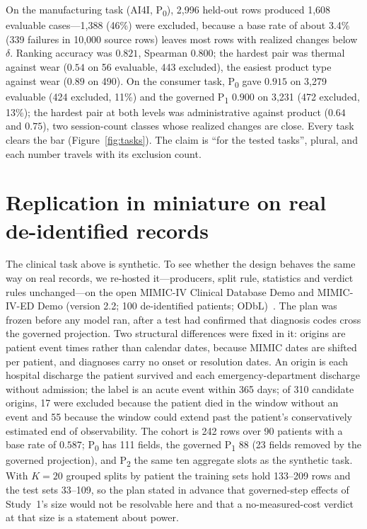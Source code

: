 \documentclass[11pt]{article}
\newcommand{\pz}{P\textsubscript{0}}
\newcommand{\po}{P\textsubscript{1}}
\newcommand{\pt}{P\textsubscript{2}}
\begin{document}
On the manufacturing task (AI4I, \pz), 2{,}996 held-out rows produced 1{,}608 evaluable cases---1{,}388 (46\%) were excluded, because a base rate of about 3.4\% (339 failures in 10{,}000 source rows) leaves most rows with realized changes below $\delta$. Ranking accuracy was $0.821$, Spearman $0.800$; the hardest pair was thermal against wear ($0.54$ on 56 evaluable, 443 excluded), the easiest product type against wear ($0.89$ on 490). On the consumer task, \pz{} gave $0.915$ on 3{,}279 evaluable (424 excluded, 11\%) and the governed \po{} $0.900$ on 3{,}231 (472 excluded, 13\%); the hardest pair at both levels was administrative against product ($0.64$ and $0.75$), two session-count classes whose realized changes are close. Every task clears the bar (Figure~\ref{fig:tasks}). The claim is ``for the tested tasks'', plural, and each number travels with its exclusion count.

\section{Replication in miniature on real de-identified records}
\label{sec:mimic}

The clinical task above is synthetic. To see whether the design behaves the same way on real records, we re-hosted it---producers, split rule, statistics and verdict rules unchanged---on the open MIMIC-IV Clinical Database Demo and MIMIC-IV-ED Demo (version 2.2; 100 de-identified patients; ODbL)~\citep{mimiciv,mimicdemo,mimiceddemo,physionet}. The plan was frozen before any model ran, after a test had confirmed that diagnosis codes cross the governed projection. Two structural differences were fixed in it: origins are patient event times rather than calendar dates, because MIMIC dates are shifted per patient, and diagnoses carry no onset or resolution dates. An origin is each hospital discharge the patient survived and each emergency-department discharge without admission; the label is an acute event within 365 days; of 310 candidate origins, 17 were excluded because the patient died in the window without an event and 55 because the window could extend past the patient's conservatively estimated end of observability. The cohort is 242 rows over 90 patients with a base rate of $0.587$; \pz{} has 111 fields, the governed \po{} 88 (23 fields removed by the governed projection), and \pt{} the same ten aggregate slots as the synthetic task. With $K=20$ grouped splits by patient the training sets hold 133--209 rows and the test sets 33--109, so the plan stated in advance that governed-step effects of Study~1's size would not be resolvable here and that a no-measured-cost verdict at that size is a statement about power.
\end{document}
